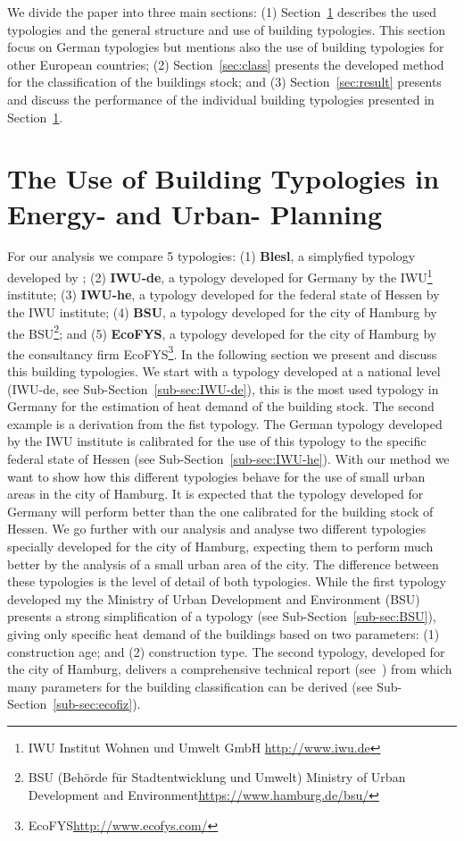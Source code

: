 \documentclass[authoryear,preprint,review,12pt]{elsarticle}
\begin{document}
\begin{linenumbers}
We divide the paper into three main sections: (1) Section~\ref{sec:Btype}
describes the used typologies and the general structure and use of building
typologies. This section focus on German typologies but mentions also the use
of building typologies for other European countries; (2)
Section~\ref{sec:class} presents the developed method for the classification of
the buildings stock; and (3) Section~\ref{sec:result} presents and discuss the
performance of the individual building typologies presented in
Section~\ref{sec:Btype}.\\

\section{The Use of Building Typologies in Energy- and Urban-
Planning}\label{sec:Btype}

For our analysis we compare 5 typologies:
(1) \textbf{Blesl}, a simplyfied typology developed by
\citeauthor{Blesl.2007};
(2) \textbf{IWU-de}, a typology developed for Germany by the IWU\footnote{IWU
    Institut Wohnen und Umwelt GmbH \url{http://www.iwu.de}} institute;
(3) \textbf{IWU-he}, a typology developed for the federal state of Hessen by
the IWU institute;
(4) \textbf{BSU}, a typology developed for the city of Hamburg by the
BSU\footnote{BSU (Behörde für Stadtentwicklung und Umwelt) Ministry of Urban
    Development and Environment\url{https://www.hamburg.de/bsu/}}; and
(5) \textbf{EcoFYS}, a typology developed for the city of Hamburg by the
consultancy firm EcoFYS\footnote{EcoFYS\url{http://www.ecofys.com/}}.
In the following section we present and discuss this building typologies. We
start with a typology developed at a national level (IWU-de, see
Sub-Section~\ref{sub-sec:IWU-de}), this is the most used typology in Germany
for the estimation of heat demand of the building stock.  The second example is
a derivation from the fist typology.  The German typology developed by the IWU
institute is calibrated for the use of this typology to the specific federal
state of Hessen (see Sub-Section~\ref{sub-sec:IWU-he}).  With our method we
want to show how this different typologies behave for the use of small urban
areas in the city of Hamburg.  It is expected that the typology developed for
Germany will perform better than the one calibrated for the building stock of
Hessen.  We go further with our analysis and analyse two different typologies
specially developed for the city of Hamburg, expecting them to perform much
better by the analysis of a small urban area of the city.  The difference
between these typologies is the level of detail of both typologies.  While the
first typology developed my the Ministry of Urban Development and Environment
(BSU) presents a strong simplification of a typology (see
Sub-Section~\ref{sub-sec:BSU}), giving only specific heat demand of the
buildings based on two parameters:
(1) construction age; and
(2) construction type.
The second typology, developed for the city of Hamburg, delivers a
comprehensive technical report (see~\cite{Hermelink.2011}) from which many
parameters for the building classification can be derived (see
Sub-Section~\ref{sub-sec:ecofiz}).\\


\end{linenumbers}
\end{document}
